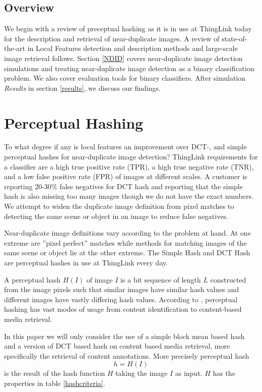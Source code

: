\documentclass[english,12pt,a4paper,pdftex,elec,utf8, table]{aaltothesis}
\begin{document}
\subsection{Overview}
We begin with a review of preceptual hashing as it is in use at ThingLink today for the description and retrieval of near-duplicate images. A review of state-of-the-art in Local Features detection and description methods and large-scale image retrieval follows. Section \ref{NDID} covers near-duplicate image detection simulations and treating near-duplicate image detection as a binary classification problem. We also cover evaluation tools for binary classifiers. After simulation \emph{Results} in section \ref{results}, we discuss our findings.

\clearpage

\section{Perceptual Hashing}\label{perceptualhash}
To what degree if any is local features an improvement over DCT-, and simple perceptual hashes for near-duplicate image detection? ThingLink requirements for a classifier are a high true positive rate (TPR), a high true negative rate (TNR), and a low false positive rate (FPR) of images at different scales. A customer is reporting 20-30\% false negatives for DCT hash and reporting that the simple hash is also missing too many images though we do not have the exact numbers. We attempt to widen the duplicate image definition from pixel matches to detecting the same scene or object in an image to reduce false negatives.

Near-duplicate image definitions vary according to the problem at hand. At one extreme are ''pixel perfect'' matches while methods for matching images of the same scene or object lie at the other extreme. The Simple Hash and DCT Hash are perceptual hashes in use at ThingLink every day.

A perceptual hash $H(I)$ of image $I$ is a bit sequence of length $L$ constructed from the image pixels such that similar images have similar hash values and different images have vastly differing hash values. According to \cite{Zauner2010}, perceptual hashing has vast modes of usage from content identification to content-based media retrieval.

In this paper we will only consider the use of a simple block mean based hash and a version of DCT based hash on content based media retrieval, more specifically the retrieval of content annotations. More precisely perceptual hash
\begin{equation}\label{hashfunction}
h = H(I)
\end{equation}
is the result of the hash function $H$ taking the image $I$ as input. $H$ has the properties in table \ref{hashcriteria}.
\end{document}
